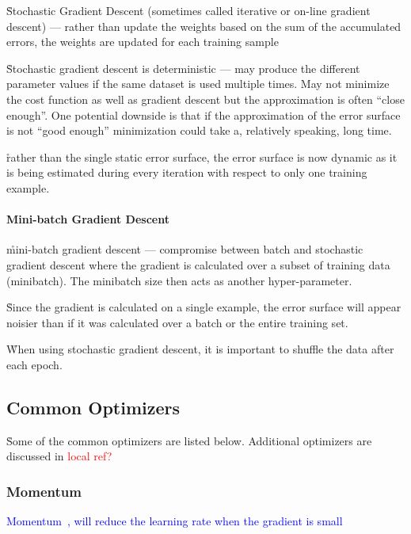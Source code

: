 \r{Stochastic Gradient Descent (sometimes called iterative or on-line gradient descent) --- rather than update the weights based on the sum of the accumulated errors, the weights are updated for each training sample}

\r{Stochastic gradient descent is deterministic --- may produce the different parameter values if the same dataset is used multiple times. May not minimize the cost function as well as gradient descent but the approximation is often ``close enough''. One potential downside is that if the approximation of the error surface is not ``good enough'' minimization could take a, relatively speaking, long time.}

\r{rather than the single static error surface, the error surface is now dynamic as it is being estimated during every iteration with respect to only one training example.}


\paragraph{Mini-batch Gradient Descent}

\r{mini-batch gradient descent --- compromise between batch and stochastic gradient descent where the gradient is calculated over a subset of training data (minibatch). The minibatch size then acts as another hyper-parameter.}

\r{Since the gradient is calculated on a single example, the error surface will appear noisier than if it was calculated over a batch or the entire training set.}

\r{When using stochastic gradient descent, it is important to shuffle the data after each epoch.}



\subsection{Common Optimizers}

\r{Some of the common optimizers are listed below. Additional optimizers are discussed in \textcolor{red}{local ref?}}

\subsubsection{Momentum}

\textcolor{blue}{Momentum~\cite{qian1999momentum}, will reduce the learning rate when the gradient is small}

